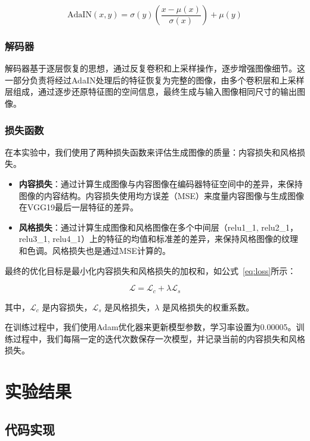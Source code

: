 \documentclass[UTF8,openany]{ctexbook}
\begin{document}
\begin{equation}
    \text{AdaIN}(x, y) = \sigma(y) \left( \frac{x - \mu(x)}{\sigma(x)} \right) + \mu(y)
    \label{eq:adain}
\end{equation}

\subsection{解码器}

解码器基于逐层恢复的思想，通过反复卷积和上采样操作，逐步增强图像细节。这一部分负责将经过AdaIN处理后的特征恢复为完整的图像，由多个卷积层和上采样层组成，通过逐步还原特征图的空间信息，最终生成与输入图像相同尺寸的输出图像。

\subsection{损失函数}

在本实验中，我们使用了两种损失函数来评估生成图像的质量：内容损失和风格损失。

\begin{itemize}
    \item \textbf{内容损失}：通过计算生成图像与内容图像在编码器特征空间中的差异，来保持图像的内容结构。内容损失使用均方误差（MSE）来度量内容图像与生成图像在VGG19最后一层特征的差异。
    \item \textbf{风格损失}：通过计算生成图像和风格图像在多个中间层（relu1\_1, relu2\_1，relu3\_1, relu4\_1）上的特征的均值和标准差的差异，来保持风格图像的纹理和色调。风格损失也是通过MSE计算的。
\end{itemize}

最终的优化目标是最小化内容损失和风格损失的加权和，如公式~\ref{eq:loss}所示：

\begin{equation}
    \mathcal{L} = \mathcal{L}_c + \lambda \mathcal{L}_s
    \label{eq:loss}
\end{equation}

其中，$\mathcal{L}_c$ 是内容损失，$\mathcal{L}_s$ 是风格损失，$\lambda$ 是风格损失的权重系数。

在训练过程中，我们使用Adam优化器来更新模型参数，学习率设置为0.00005。训练过程中，我们每隔一定的迭代次数保存一次模型，并记录当前的内容损失和风格损失。

\chapter{实验结果}

\section{代码实现}
\end{document}
